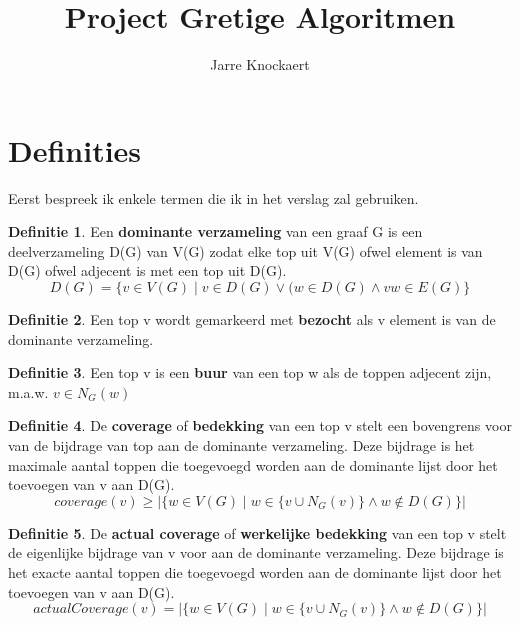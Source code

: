 \documentclass[11pt, a4paper, table]{article}
\theoremstyle{definition}
\theoremstyle{definition}
\newtheorem{definitie}{Definitie}
\theoremstyle{definition}
\begin{document}
	\title{Project Gretige Algoritmen}
	\author{Jarre Knockaert}
	\maketitle
	
\thispagestyle{empty}
\newpage
{}

\section{Definities}
Eerst bespreek ik enkele termen die ik in het verslag zal gebruiken.
\begin{definitie}
	Een \textbf{dominante verzameling} van een graaf G is een deelverzameling D(G) van V(G) zodat elke top uit V(G) ofwel element is van D(G) ofwel adjecent is met een top uit D(G). 
	\begin{equation}
	D(G) = \{v \in V(G) \mid v \in D(G) \vee (w \in D(G) \land vw \in E(G)\}
	\end{equation}
\end{definitie}
\begin{definitie}
	Een top v wordt gemarkeerd met \textbf{bezocht} als v element is van de dominante verzameling.
\end{definitie}
\begin{definitie}
	Een top v is een \textbf{buur} van een top w als de toppen adjecent zijn, m.a.w. $v \in N_G(w)$
\end{definitie}
\begin{definitie}
	De \textbf{coverage} of \textbf{bedekking} van een top v stelt een bovengrens voor van de bijdrage van top aan de dominante verzameling. Deze bijdrage is het maximale aantal toppen die toegevoegd worden aan de dominante lijst door het toevoegen van v aan D(G). 
	\begin{equation}
	coverage(v) \geq \vert \{w \in V(G) \mid w \in \{v \cup N_G(v)\} \land w \not\in D(G) \}\vert
	\end{equation}
\end{definitie}
\begin{definitie}
	De \textbf{actual coverage} of \textbf{werkelijke bedekking} van een top v stelt de eigenlijke bijdrage van v voor aan de dominante verzameling. Deze bijdrage is het exacte aantal toppen die toegevoegd worden aan de dominante lijst door het toevoegen van v aan D(G).
	\begin{equation}
	actualCoverage(v) = \vert \{w \in V(G) \mid w \in \{v \cup N_G(v)\} \land w \not\in D(G) \}\vert
	\end{equation} 
\end{definitie}
\end{document}
